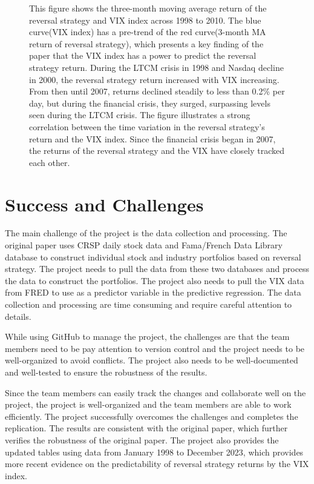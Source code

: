 \documentclass[11pt]{article}
\begin{document}
\begin{landscape}
\begin{figure}
        \small 
        This figure shows the three-month moving average return of the reversal strategy 
        and VIX index across 1998 to 2010. The blue curve(VIX index) has a pre-trend of 
        the red curve(3-month MA return of reversal strategy), which presents a key finding 
        of the paper that the VIX index has a power to predict the reversal strategy return.
        During the LTCM crisis in 1998 and  Nasdaq decline in 2000, the reversal strategy 
        return increased with VIX increasing. From then until 2007, returns declined steadily
        to less than 0.2\% per day, but during the financial crisis, they surged, surpassing 
        levels seen during the LTCM crisis. The figure illustrates a strong correlation 
        between the time variation in the reversal strategy's return and the VIX index. 
        Since the financial crisis began in 2007, the returns of the reversal strategy 
        and the VIX have closely tracked each other.
        \medskip
    \end{figure}
\end{landscape}





\section{Success and Challenges}

The main challenge of the project is the data collection and processing. The original paper uses 
CRSP daily stock data and Fama/French Data Library database to construct individual stock and 
industry portfolios based on reversal strategy. The project needs to pull the data from these two 
databases and process the data to construct the portfolios. The project also needs to pull the 
VIX data from FRED to use as a predictor variable in the predictive regression. The data collection 
and processing are time consuming and require careful attention to details.

While using GitHub to manage the project, the challenges are that the team members need to be pay 
attention to version control and the project needs to be well-organized to avoid conflicts. The
project also needs to be well-documented and well-tested to ensure the robustness of the results.

Since the team members can easily track the changes and collaborate well on the project, 
the project is well-organized and the team members are able to work efficiently. The project 
successfully overcomes the challenges and completes the replication. The results are consistent 
with the original paper, which further verifies the robustness of the original paper. The project 
also provides the updated tables using data from January 1998 to December 2023, which provides 
more recent evidence on the predictability of reversal strategy returns by the VIX index.
\end{document}
